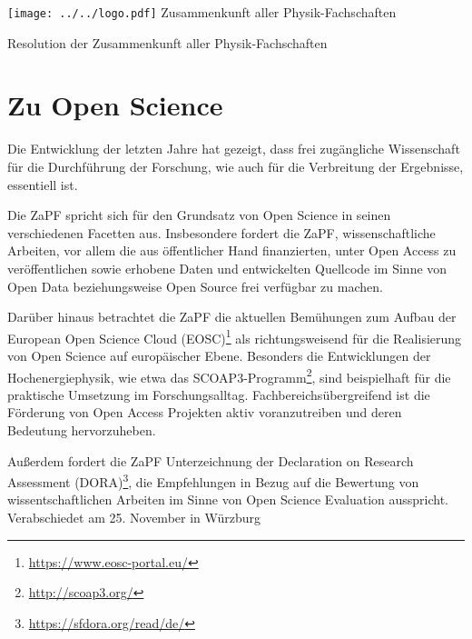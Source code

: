 \documentclass[DIV=calc]{scrartcl}
\begin{document}
    \hspace{0.87\textwidth}
    \begin{minipage}{120pt}
        \vspace{-1.8cm}
        \texttt{[image: ../../logo.pdf]}
        \centering
        \small Zusammenkunft aller Physik-Fachschaften
    \end{minipage}
    \begin{center}
        \huge{Resolution der Zusammenkunft aller Physik-Fachschaften}\vspace{.25\baselineskip}\\
        \normalsize
    \end{center}
    \vspace{1cm}

\section*{Zu Open Science}

Die Entwicklung der letzten Jahre hat gezeigt, dass frei zugängliche Wissenschaft für die Durchführung der Forschung, wie auch für die Verbreitung der Ergebnisse,  essentiell ist.

Die ZaPF spricht sich für den Grundsatz von Open Science in seinen verschiedenen Facetten aus.  Insbesondere fordert die ZaPF, wissenschaftliche Arbeiten, vor allem die aus öffentlicher Hand finanzierten, unter Open Access zu veröffentlichen sowie erhobene Daten und entwickelten Quellcode im Sinne von Open Data beziehungsweise Open Source frei verfügbar zu machen.

Darüber hinaus betrachtet die ZaPF die aktuellen Bemühungen zum Aufbau der European Open Science Cloud (EOSC)\footnote{\url{https://www.eosc-portal.eu/}} als richtungsweisend für die Realisierung von Open Science auf europäischer Ebene.
Besonders die Entwicklungen der Hochenergiephysik, wie etwa das SCOAP3-Programm\footnote{\url{http://scoap3.org/}}, sind beispielhaft für die praktische Umsetzung im Forschungsalltag. Fachbereichsübergreifend ist die Förderung von Open Access Projekten aktiv voranzutreiben und deren Bedeutung hervorzuheben.

Außerdem fordert die ZaPF Unterzeichnung der Declaration on Research Assessment (DORA)\footnote{\url{https://sfdora.org/read/de/}}, die Empfehlungen in Bezug auf die Bewertung von wissentschaftlichen Arbeiten im Sinne von Open Science Evaluation ausspricht.\\
\vfill\hfill Verabschiedet am 25. November in Würzburg\\
\end{document}
